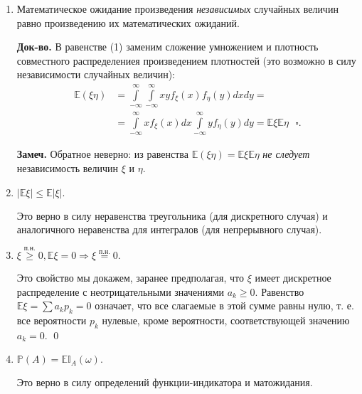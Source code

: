 \documentclass[oneside,final,14pt]{extreport}
\newcommand\mynote{{\bf Замеч.}}
\newcommand\mycon{{\bf Следствие.}}
\newcommand\myqed{{\bf Док-во.}}
\newcommand\myprob[1]{{\mathbb{P}(#1)}}
\renewenvironment{proof}{{\bfseries Доказательство.}}{\qed}
\theoremstyle{definition}
\begin{document}
\begin{enumerate}
    \myqed{} Неотрицательность $\xi$ означает, что $a_i \geq 0$ при всех $i$ в случае дискретного распределения, либо $f_\xi(x) = 0$ при $x < 0$ - для абсолютно непрерывного распределения. И в том, и в другом случае имеем:
    $$\mathbb{E} \xi=\sum a_{i} p_{i} \geqslant 0 \quad \text { или } \quad \mathbb{E} \xi=\int\limits_{0}^{\infty} x f(x) d x \geqslant 0 ~~~ \square.$$
    
    \mycon{} Если $\xi \leqslant \eta$, то $\mathbb{E}\xi \leqslant \mathbb{E}\eta.$
    
    \mycon{} Если $a \leqslant \xi \leqslant b$, то $a \leqslant \mathbb{E}\xi \leqslant b$.
    
    \item Математическое ожидание произведения {\it независимых} случайных величин равно произведению их математических ожиданий.
    
    \myqed{} В равенстве (1) заменим сложение умножением и плотность совместного распределениея произведением плотностей (это возможно в силу независимости случайных величин):
    $$\begin{aligned}
    \mathbb{E}(\xi \eta) &=\int\limits_{-\infty}^{\infty} \int\limits_{-\infty}^{\infty} x y f_{\xi}(x) f_{\eta}(y) d x d y=\\
    &=\int\limits_{-\infty}^{\infty} x f_{\xi}(x) d x \int\limits_{-\infty}^{\infty} y f_{\eta}(y) d y=\mathbb{E} \xi \mathbb{E} \eta ~~~ \square.
    \end{aligned}$$
    
    \mynote{} Обратное неверно: из равенства $\mathbb{E}(\xi \eta) = \mathbb{E}\xi \mathbb{E} \eta$ {\it не следует} независимость величин $\xi$ и $\eta$.
    
    \item $|\mathbb{E}\xi| \leqslant \mathbb{E}|\xi|.$
    
    Это верно в силу неравенства треугольника (для дискретного случая) и аналогичного неравенства для интегралов (для непрерывного случая).
    \item $\xi \overset{\text{п.н.}}{\geqslant} 0, \mathbb{E}\xi = 0 \Rightarrow \xi \overset{\text{п.н.}}{=} 0.$
    
    \begin{proof}
    Это свойство мы докажем, заранее предполагая, что $\xi$ имеет дискретное распределение с неотрицательными значениями $a_k \geqslant 0$. Равенство $\mathbb{E}\xi = \sum a_k p_k = 0$ означает, что все слагаемые в этой сумме равны нулю, т. е. все вероятности $p_k$ нулевые, кроме вероятности, соответствующей значению $a_k = 0$.
    \end{proof}
    \item $\myprob{A} = \mathbb{E}\mathbb{I}_A(\omega).$
    
    Это верно в силу определений функции-индикатора и матожидания.
\end{enumerate}
\end{document}
